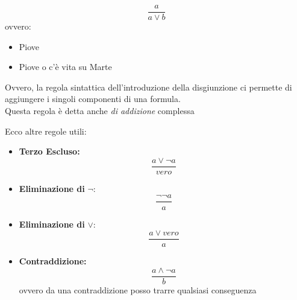 \documentclass[a4paper,12pt, oneside]{book}
\begin{document}
\begin{esempio}
$$\frac{a}{a\vee b}$$
ovvero:
\begin{itemize}
\item Piove
\item Piove o c'è vita su Marte
\end{itemize}
Ovvero, la regola sintattica dell’introduzione della disgiunzione ci permette di aggiungere i singoli componenti di una formula.\\
Questa regola è detta anche \textit{di addizione}
complessa
\end{esempio}
\begin{esempio}
Ecco altre regole utili:
\begin{itemize}
\item \textbf{Terzo Escluso:}
$$\frac{a\vee\neg a}{vero}$$
\item \textbf{Eliminazione di} $\neg$:
$$\frac{\neg\neg a}{a}$$
\item \textbf{Eliminazione di} $\vee$:
$$\frac{a\vee vero}{a}$$
\item \textbf{Contraddizione:}
$$\frac{a\wedge\neg a}{b}$$
ovvero da una contraddizione posso trarre qualsiasi conseguenza
\end{itemize}
\end{esempio}
\end{document}
